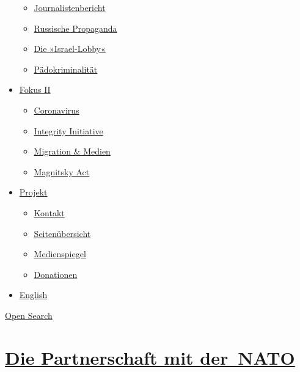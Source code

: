 \begin{itemize}
  \begin{itemize}
  \tightlist
  \item
    \href{https://swprs.org/bericht-eines-journalisten/}{Journalistenbericht}
  \item
    \href{https://swprs.org/russische-propaganda/}{Russische Propaganda}
  \item
    \href{https://swprs.org/die-israel-lobby-fakten-und-mythen/}{Die
    »Israel-Lobby«}
  \item
    \href{https://swprs.org/geopolitik-und-paedokriminalitaet/}{Pädokriminalität}
  \end{itemize}
\item
  \href{https://swprs.org/migration-und-medien/}{Fokus II}

  \begin{itemize}
  \tightlist
  \item
    \href{https://swprs.org/covid-19-hinweis-ii/}{Coronavirus}
  \item
    \href{https://swprs.org/die-integrity-initiative/}{Integrity
    Initiative}
  \item
    \href{https://swprs.org/migration-und-medien/}{Migration \& Medien}
  \item
    \href{https://swprs.org/der-fall-magnitsky/}{Magnitsky Act}
  \end{itemize}
\item
  \href{https://swprs.org/kontakt/}{Projekt}

  \begin{itemize}
  \tightlist
  \item
    \href{https://swprs.org/kontakt/}{Kontakt}
  \item
    \href{https://swprs.org/uebersicht/}{Seitenübersicht}
  \item
    \href{https://swprs.org/medienspiegel/}{Medienspiegel}
  \item
    \href{https://swprs.org/donationen/}{Donationen}
  \end{itemize}
\item
  \href{https://swprs.org/contact/}{English}
\end{itemize}

\protect\hyperlink{}{Open Search}

\hypertarget{die-partnerschaft-mit-der-nato}{%
\section{\texorpdfstring{\href{https://swprs.org/2017/03/01/schweizer-medien-nato/}{Die
Partnerschaft mit
der~NATO}}{Die Partnerschaft mit der~NATO}}\label{die-partnerschaft-mit-der-nato}}

